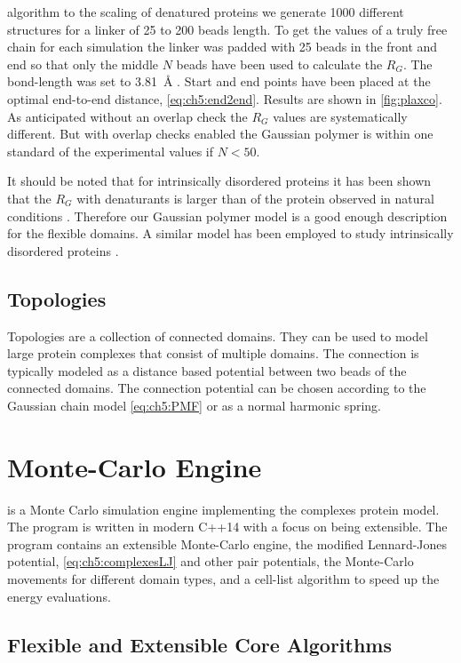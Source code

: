 \documentclass[12pt, twoside]{report}
\begin{document}
algorithm to the scaling of denatured proteins we generate 1000 different
structures for a linker of 25 to 200 beads length. To get the values of a truly
free chain for each simulation the linker was padded with 25 beads in the front
and end so that only the middle $N$ beads have been used to calculate the $R_G$.
The bond-length was set to \SI{3.81}{\AA} \cite{Best2005}. Start and end points
have been placed at the optimal end-to-end distance, \cref{eq:ch5:end2end}.
Results are shown in \cref{fig:plaxco}. As anticipated without an overlap check
the $R_G$ values are systematically different. But with overlap checks enabled
the Gaussian polymer is within one standard of the experimental values if
$N<50$.

It should be noted that for intrinsically disordered proteins it has been shown
that the \(R_G\) with denaturants is larger than of the protein observed in
natural conditions \cite{Fuertes2017, Song2017, Zheng2016, Borgia2016}.
Therefore our Gaussian polymer model is a good enough description for the
flexible domains. A similar model has been employed to study intrinsically
disordered proteins \cite{Dignon2018a}.

\section{Topologies}

Topologies are a collection of connected domains. They can be used to model
large protein complexes that consist of multiple domains. The connection is
typically modeled as a distance based potential between two beads of the
connected domains. The connection potential can be chosen according to the
Gaussian chain model \cref{eq:ch5:PMF} or as a normal harmonic spring.

\chapter{Monte-Carlo Engine \complexes}

\complexes is a Monte Carlo simulation engine implementing the complexes protein
model. The program is written in modern \mbox{C++14} with a focus on being
extensible. The program contains an extensible Monte-Carlo engine, the modified
Lennard-Jones potential, \cref{eq:ch5:complexesLJ} and other pair potentials,
the Monte-Carlo movements for different domain types, and a cell-list algorithm
\cite{frenkel2001understanding} to speed up the energy evaluations.


\section{Flexible and Extensible Core Algorithms}
\end{document}
